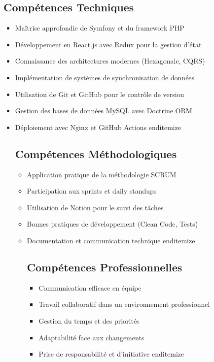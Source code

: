 \subsection{Compétences Techniques}

\begin{itemize}
    \item Maîtrise approfondie de Symfony et du framework PHP
    \item Développement en React.js avec Redux pour la gestion d'état
    \item Connaissance des architectures modernes (Hexagonale, CQRS)
    \item Implémentation de systèmes de synchronisation de données
    \item Utilisation de Git et GitHub pour le contrôle de version
    \item Gestion des bases de données MySQL avec Doctrine ORM
    \item Déploiement avec Nginx et GitHub Actions
end{itemize}

\subsection{Compétences Méthodologiques}

\begin{itemize}
    \item Application pratique de la méthodologie SCRUM
    \item Participation aux sprints et daily standups
    \item Utilisation de Notion pour le suivi des tâches
    \item Bonnes pratiques de développement (Clean Code, Tests)
    \item Documentation et communication technique
end{itemize}

\subsection{Compétences Professionnelles}

\begin{itemize}
    \item Communication efficace en équipe
    \item Travail collaboratif dans un environnement professionnel
    \item Gestion du temps et des priorités
    \item Adaptabilité face aux changements
    \item Prise de responsabilité et d'initiative
end{itemize}


\end{itemize}
\end{itemize}
\end{itemize}
